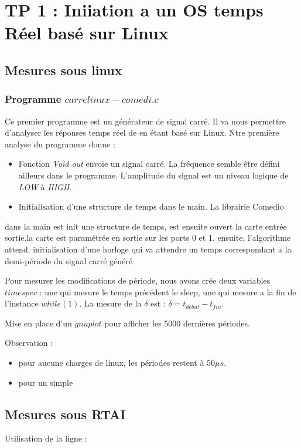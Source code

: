\chapter{TP 1 : Iniiation a un OS temps Réel basé sur Linux}

\section{Mesures sous linux}
\subsection{Programme $carrelinux-comedi.c$}
Ce premier programme est un générateur de signal carré. Il va nous permettre d'analyser les réponses temps réel de en étant basé sur Linux. Ntre première analyse du programme donne :\begin{itemize}
\item Fonction \emph{Void out} envoie un signal carré. La fréquence semble être défini ailleurs dans le programme. L'amplitude du signal est un niveau logique de \emph{LOW} à \emph{HIGH}.
\item Initialisation d'une structure de temps dans le main. La librairie Comedio
\end{itemize}

dans la main est init une structure de temps, est ensuite ouvert la carte entrée sortie.la carte est paramétrée en sortie sur les ports 0 et 1. 
ensuite, l'algorithme attend.
initialisation d'une horloge qui va attendre un temps correspondant a la demi-période  du signal carré généré


Pour mesurer les modifications de période, nous avons crée deux variables $timespec$ : une qui mesure le temps précédent le sleep, une qui mesure a la fin de l'instance $while(1)$. La mesure de la $\delta$ est : $\delta = t_{debut} - t_{fin}$. 

Mise en place d'un $gnuplot$ pour afficher les 5000 dernières périodes. 

Observation : \begin{itemize}
\item pour aucune charges de linux, les périodes restent à $50\mu s$. 
\item pour un simple 
\end{itemize}

\section{Mesures sous RTAI}

Utilisation de la ligne : 


